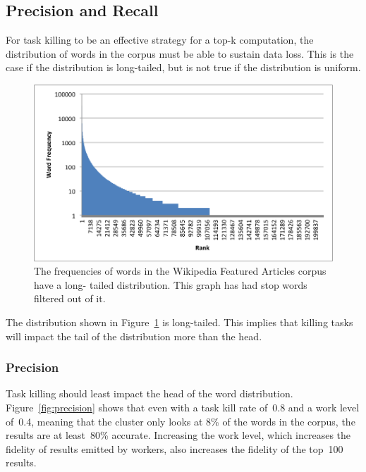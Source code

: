 \documentclass[12pt,twocolumn]{article}
\begin{document}
\subsection{Precision and Recall}
For task killing to be an effective strategy for a top-k computation, the
distribution of words in the corpus must be able to sustain data loss. This is the case
if the distribution is long-tailed, but is not true if the distribution is uniform.

\begin{figure}
\includegraphics[width=\linewidth]{long-tail-ranks.png}
\caption{The frequencies of words in the Wikipedia Featured Articles corpus have a long-
tailed distribution. This graph has had stop words~\cite{stopwords} filtered out of it.}
\label{fig:wordDist}
\end{figure}

The distribution shown in Figure~\ref{fig:wordDist} is long-tailed. This implies that killing
tasks will impact the tail of the distribution more than the head.

\subsubsection{Precision}
Task killing should least impact the head of the word distribution.
Figure~\ref{fig:precision} shows that even with a task kill rate of~0.8 and a work level of~0.4,
meaning that the cluster only looks at 8\% of the words in the corpus, the results
are at least~80\% accurate. Increasing the work level, which increases the fidelity of
results emitted by workers, also increases the fidelity of the top~100 results.
\end{document}
